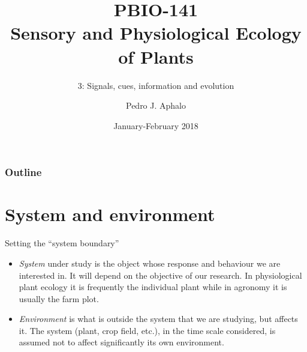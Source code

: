 \documentclass[10pt]{beamer}
\begin{document}
\title{PBIO-141\\Sensory and Physiological Ecology\\ of  Plants}
\subtitle{3: Signals, cues, information and evolution}
\author{Pedro J. Aphalo}
\date{January-February 2018}


  \begin{frame}
    \maketitle
  \end{frame}



  \begin{frame}
    \frametitle{Outline}
    \tableofcontents
  \end{frame}


\section{System and environment}

\begin{frame}{Setting the ``system boundary''}
    \begin{itemize}[type=1]
        \item<1> \emph{System} under study is the object whose response
        and behaviour we are interested in. It will depend on the
        objective of our research. In physiological plant
        ecology it is frequently the individual plant while in agronomy it is usually the farm plot.
        \item<2> \emph{Environment} is what is outside the system that
        we are studying, but affects it. The system (plant, crop field, etc.), in the time scale considered, is assumed not to affect significantly its own environment.
    \end{itemize}
\end{frame}
\end{document}
